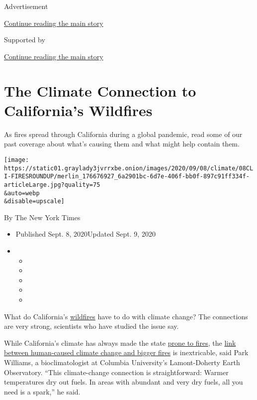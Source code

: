 Advertisement

\protect\hyperlink{after-top}{Continue reading the main story}

Supported by

\protect\hyperlink{after-sponsor}{Continue reading the main story}

\hypertarget{the-climate-connection-to-californias-wildfires}{%
\section{The Climate Connection to California's
Wildfires}\label{the-climate-connection-to-californias-wildfires}}

As fires spread through California during a global pandemic, read some
of our past coverage about what's causing them and what might help
contain them.

\texttt{[image: https://static01.graylady3jvrrxbe.onion/images/2020/09/08/climate/08CLI-FIRESROUNDUP/merlin\_176676927\_6a2901bc-6d7e-406f-bb0f-897c91ff334f-articleLarge.jpg?quality=75\\\&auto=webp\\\&disable=upscale]}

By The New York Times

\begin{itemize}
\item
  Published Sept. 8, 2020Updated Sept. 9, 2020
\item
  \begin{itemize}
  \item
  \item
  \item
  \item
  \item
  \end{itemize}
\end{itemize}

What do California's
\href{https://www.nytimes3xbfgragh.onion/2020/09/11/us/wildfires-live-updates.html}{wildfires}
have to do with climate change? The connections are very strong,
scientists who have studied the issue say.

While California's climate has always made the state
\href{https://www.nytimes3xbfgragh.onion/2020/09/10/climate/wildfires-climate-policy.html}{prone
to fires}, the
\href{https://agupubs.onlinelibrary.wiley.com/doi/full/10.1029/2019EF001210}{link
between human-caused climate change and bigger fires} is inextricable,
said Park Williams, a bioclimatologist at Columbia University's
Lamont-Doherty Earth Observatory. ``This climate-change connection is
straightforward: Warmer temperatures dry out fuels. In areas with
abundant and very dry fuels, all you need is a spark,'' he said.

